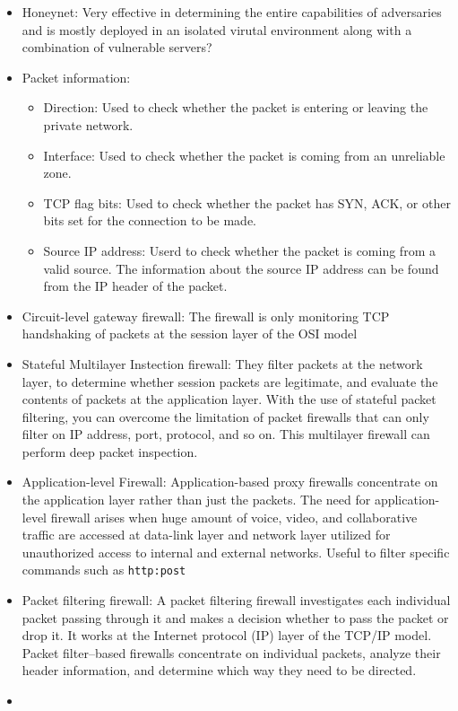 \begin{itemize}
    \item Honeynet: Very effective in determining the entire capabilities of adversaries and is mostly deployed in an isolated virutal environment along with a combination of vulnerable servers?
    \item Packet information:
    \begin{itemize}
        \item Direction: Used to check whether the packet is entering or leaving the private network.
        \item Interface: Used to check whether the packet is coming from an unreliable zone.
        \item TCP flag bits: Used to check whether the packet has SYN, ACK, or other bits set for the connection to be made.
        \item Source IP address: Userd to check whether the packet is coming from a valid source. The information about the source IP address can be found from the IP header of the packet.
    \end{itemize}
    \item Circuit-level gateway firewall: The firewall is only monitoring TCP handshaking of packets at the session layer of the OSI model
    \item Stateful Multilayer Instection firewall: They filter packets at the network layer, to determine whether session packets are legitimate, and evaluate the contents of packets at the application layer. With the use of stateful packet filtering, you can overcome the limitation of packet firewalls that can only filter on IP address, port, protocol, and so on. This multilayer firewall can perform deep packet inspection.
    \item Application-level Firewall: Application-based proxy firewalls concentrate on the application layer rather than just the packets. The need for application-level firewall arises when huge amount of voice, video, and collaborative traffic are accessed at data-link layer and network layer utilized for unauthorized access to internal and external networks. Useful to filter specific commands such as \verb|http:post|
    \item Packet filtering firewall:  A packet filtering firewall investigates each individual packet passing through it and makes a decision whether to pass the packet or drop it. It works at the Internet protocol (IP) layer of the TCP/IP model. Packet filter–based firewalls concentrate on individual packets, analyze their header information, and determine which way they need to be directed.
    \item 
\end{itemize}

